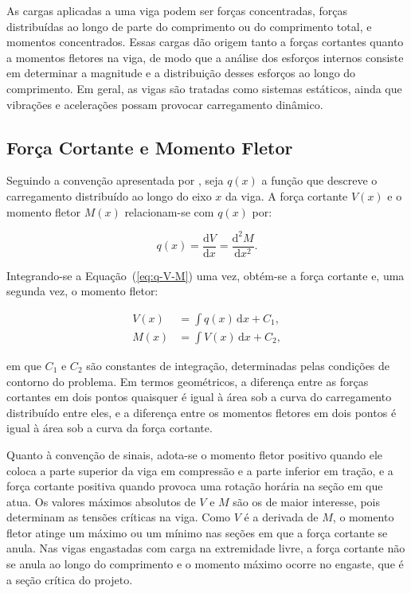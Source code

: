 \documentclass[arial,centeredequations,english,brazilian,oneside,section=TITLE]{ifes8}
\begin{document}
As cargas aplicadas a uma viga podem ser forças concentradas, forças distribuídas ao
longo de parte do comprimento ou do comprimento total, e momentos concentrados. Essas
cargas dão origem tanto a forças cortantes quanto a momentos fletores na viga, de
modo que a análise dos esforços internos consiste em determinar a magnitude e a
distribuição desses esforços ao longo do comprimento. Em
geral, as vigas são tratadas como sistemas estáticos, ainda que vibrações e acelerações
possam provocar carregamento dinâmico.

\subsection{Força Cortante e Momento Fletor}
\label{sub:cortante-momento}

Seguindo a convenção apresentada por , seja $q(x)$ a função
que descreve o carregamento distribuído ao longo do eixo $x$ da viga. A força
cortante $V(x)$ e o momento fletor $M(x)$ relacionam-se com $q(x)$ por:

\begin{equation}
  \label{eq:q-V-M}
  q(x) = \frac{\mathrm{d}V}{\mathrm{d}x} = \frac{\mathrm{d}^2 M}{\mathrm{d}x^2}.
\end{equation}

Integrando-se a Equação~(\ref{eq:q-V-M}) uma vez, obtém-se a força cortante e, uma
segunda vez, o momento fletor:

\begin{align}
  V(x) &= \int q(x)\,\mathrm{d}x + C_1, \label{eq:V-integral}\\
  M(x) &= \int V(x)\,\mathrm{d}x + C_2, \label{eq:M-integral}
\end{align}

em que $C_1$ e $C_2$ são constantes de integração, determinadas pelas condições de
contorno do problema. Em termos geométricos, a
diferença entre as forças cortantes em dois pontos quaisquer é igual à área sob a curva
do carregamento distribuído entre eles, e a diferença entre os momentos fletores em dois
pontos é igual à área sob a curva da força cortante.

Quanto à convenção de sinais, adota-se o momento fletor positivo quando ele coloca
a parte superior da viga em compressão e a parte inferior em tração, e a força
cortante positiva quando provoca uma rotação horária na seção em que atua.
Os valores máximos absolutos
de $V$ e $M$ são os de maior interesse, pois determinam as tensões críticas na viga.
Como $V$ é a derivada de $M$, o momento fletor atinge um máximo ou um mínimo nas
seções em que a força cortante se anula. Nas vigas
engastadas com carga na extremidade livre, a força cortante não se anula ao longo do
comprimento e o momento máximo ocorre no engaste, que é a seção crítica do projeto.
\end{document}
